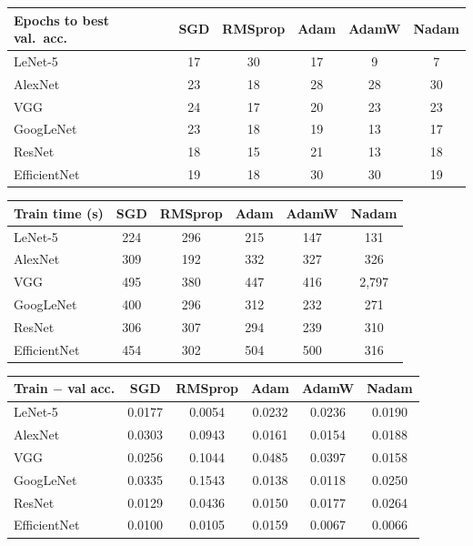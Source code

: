 \documentclass[12pt,a4paper]{article}
\begin{document}
\begin{center}
\renewcommand{\arraystretch}{1.2}\footnotesize
\begin{tabular}{|l|c|c|c|c|c|}
\hline
\textbf{Epochs to best val.\ acc.} & \textbf{SGD} & \textbf{RMSprop} & \textbf{Adam} & \textbf{AdamW} & \textbf{Nadam} \\ \hline
LeNet-5 & 17 & 30 & 17 & 9 & 7 \\ \hline
AlexNet & 23 & 18 & 28 & 28 & 30 \\ \hline
VGG & 24 & 17 & 20 & 23 & 23 \\ \hline
GoogLeNet & 23 & 18 & 19 & 13 & 17 \\ \hline
ResNet & 18 & 15 & 21 & 13 & 18 \\ \hline
EfficientNet & 19 & 18 & 30 & 30 & 19 \\ \hline
\end{tabular}
\end{center}
\begin{center}
\renewcommand{\arraystretch}{1.2}\footnotesize
\begin{tabular}{|l|c|c|c|c|c|}
\hline
\textbf{Train time (s)} & \textbf{SGD} & \textbf{RMSprop} & \textbf{Adam} & \textbf{AdamW} & \textbf{Nadam} \\ \hline
LeNet-5 & 224 & 296 & 215 & 147 & 131 \\ \hline
AlexNet & 309 & 192 & 332 & 327 & 326 \\ \hline
VGG & 495 & 380 & 447 & 416 & 2,797 \\ \hline
GoogLeNet & 400 & 296 & 312 & 232 & 271 \\ \hline
ResNet & 306 & 307 & 294 & 239 & 310 \\ \hline
EfficientNet & 454 & 302 & 504 & 500 & 316 \\ \hline
\end{tabular}
\end{center}
\begin{center}
\renewcommand{\arraystretch}{1.2}\footnotesize
\begin{tabular}{|l|c|c|c|c|c|}
\hline
\textbf{Train $-$ val acc.} & \textbf{SGD} & \textbf{RMSprop} & \textbf{Adam} & \textbf{AdamW} & \textbf{Nadam} \\ \hline
LeNet-5 & 0.0177 & 0.0054 & 0.0232 & 0.0236 & 0.0190 \\ \hline
AlexNet & 0.0303 & 0.0943 & 0.0161 & 0.0154 & 0.0188 \\ \hline
VGG & 0.0256 & 0.1044 & 0.0485 & 0.0397 & 0.0158 \\ \hline
GoogLeNet & 0.0335 & 0.1543 & 0.0138 & 0.0118 & 0.0250 \\ \hline
ResNet & 0.0129 & 0.0436 & 0.0150 & 0.0177 & 0.0264 \\ \hline
EfficientNet & 0.0100 & 0.0105 & 0.0159 & 0.0067 & 0.0066 \\ \hline
\end{tabular}
\end{center}
\end{document}
